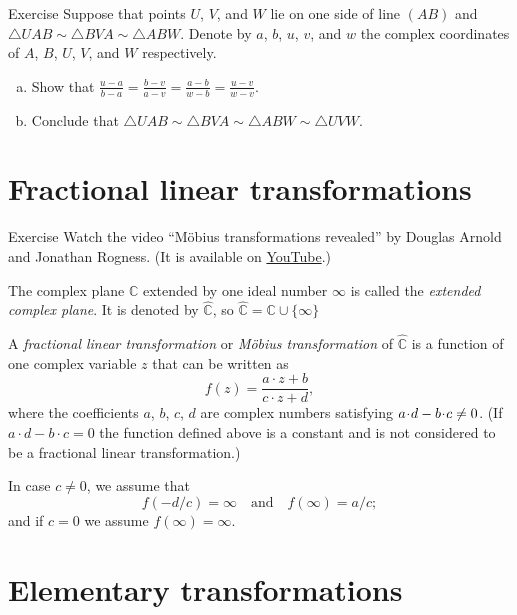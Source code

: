 \medskip

\begin{thm}{Exercise}\label{ex:4-sim}
Suppose that points $U$, $V$, and $W$ lie on one side of line $(AB)$ and 
$\triangle UAB\sim \triangle BVA \sim \triangle ABW$.
Denote by $a$, $b$, $u$, $v$, and $w$ the complex coordinates of $A$, $B$, $U$, $V$, and $W$ respectively.
\begin{enumerate}[(a)]
 \item Show that $\tfrac{u-a}{b-a}=\tfrac{b-v}{a-v}=\tfrac{a-b}{w-b}=\tfrac{u-v}{w-v}$.
 \item Conclude that $\triangle UAB\sim \triangle BVA \sim \triangle ABW\sim \triangle UVW$.
\end{enumerate}
 
\end{thm}

\section{Fractional linear transformations}

\begin{thm}{Exercise}\label{ex:movie}
Watch the video ``Möbius transformations revealed'' by Douglas Arnold and Jonathan Rogness.
(It is available on \href{http://youtu.be/JX3VmDgiFnY}{YouTube}.)
\end{thm}


The complex plane $\mathbb{C}$ extended by one ideal number $\infty$ 
is called the \emph{extended complex plane}.
It is denoted by $\hat{\mathbb{C}}$, so $\hat{\mathbb{C}}=\mathbb{C}\cup\{\infty\}$

A \emph{fractional linear transformation} or \emph{M\"obius transformation} of  $\hat{\mathbb{C}}$ is a function of one complex variable $z$
that can be written as
$$f(z) = \frac{a\cdot z + b}{c\cdot z + d},$$
where the coefficients $a$, $b$, $c$, $d$ are complex numbers satisfying $a\cdot d \z- b\cdot c \not= 0$.
(If $a\cdot d - b\cdot c = 0$ the function defined above is a constant and is not considered to be a fractional linear transformation.) 

In case $c\not=0$, we assume that
$$f(-d/c) = \infty
\quad
\text{and}
\quad
f(\infty) = a/c;$$
and if $c=0$ we assume
$f(\infty) = \infty$.

\section{Elementary transformations}

